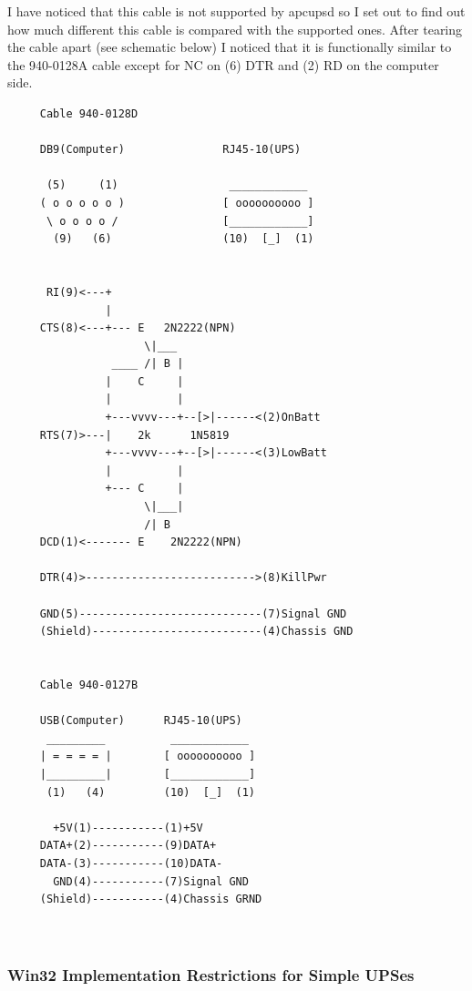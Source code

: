 {{{{{{{{{{I have noticed that this cable is not supported by apcupsd so I set out to
find out how much different this cable is compared with the supported ones.
After tearing the cable apart (see schematic below) I noticed that it is
functionally similar to the 940-0128A cable except for NC on (6) DTR and (2)
RD on the computer side. 

\footnotesize
\begin{verbatim}
     Cable 940-0128D
     
     DB9(Computer)               RJ45-10(UPS)
     
      (5)     (1)                 ____________
     ( o o o o o )               [ oooooooooo ]
      \ o o o o /                [____________]
       (9)   (6)                 (10)  [_]  (1)
     
     
      RI(9)<---+
               |
     CTS(8)<---+--- E   2N2222(NPN)
                     \|___
                ____ /| B |
               |    C     |
               |          |
               +---vvvv---+--[>|------<(2)OnBatt
     RTS(7)>---|    2k      1N5819
               +---vvvv---+--[>|------<(3)LowBatt
               |          |
               +--- C     |
                     \|___|
                     /| B
     DCD(1)<------- E    2N2222(NPN)
     
     DTR(4)>-------------------------->(8)KillPwr
     
     GND(5)----------------------------(7)Signal GND
     (Shield)--------------------------(4)Chassis GND
     
     
     Cable 940-0127B
     
     USB(Computer)      RJ45-10(UPS)
      _________          ____________
     | = = = = |        [ oooooooooo ]
     |_________|        [____________]
      (1)   (4)         (10)  [_]  (1)
     
       +5V(1)-----------(1)+5V
     DATA+(2)-----------(9)DATA+
     DATA-(3)-----------(10)DATA-
       GND(4)-----------(7)Signal GND
     (Shield)-----------(4)Chassis GRND
     
     
\end{verbatim}
\normalsize

\label{Win32-Implementation-Restrictions-for-Simple-UPSes}

\subsubsection*{Win32 Implementation Restrictions for Simple UPSes}

}}}}}}}}}}
